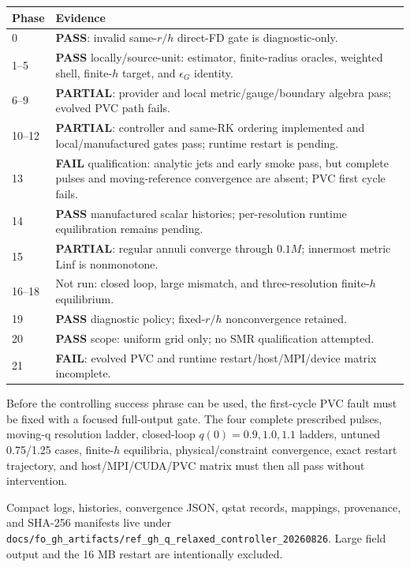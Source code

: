 \documentclass[10pt]{article}
\newcommand{\Pass}{\textcolor{pass}{\textbf{PASS}}}
\newcommand{\Fail}{\textcolor{fail}{\textbf{FAIL}}}
\newcommand{\Partial}{\textcolor{partial}{\textbf{PARTIAL}}}
\newcommand{\code}[1]{\texttt{#1}}
\begin{document}
\small
\begin{longtable}{@{}p{}p{}@{}}
\toprule
Phase & Evidence\\
\midrule
0 & \Pass{}: invalid same-$r/h$ direct-FD gate is diagnostic-only.\\
1--5 & \Pass{} locally/source-unit: estimator, finite-radius oracles, weighted shell, finite-$h$ target, and $\epsilon_G$ identity.\\
6--9 & \Partial{}: provider and local metric/gauge/boundary algebra pass; evolved PVC path fails.\\
10--12 & \Partial{}: controller and same-RK ordering implemented and local/manufactured gates pass; runtime restart is pending.\\
13 & \Fail{} qualification: analytic jets and early smoke pass, but complete pulses and moving-reference convergence are absent; PVC first cycle fails.\\
14 & \Pass{} manufactured scalar histories; per-resolution runtime equilibration remains pending.\\
15 & \Partial{}: regular annuli converge through $0.1M$; innermost metric Linf is nonmonotone.\\
16--18 & Not run: closed loop, large mismatch, and three-resolution finite-$h$ equilibrium.\\
19 & \Pass{} diagnostic policy; fixed-$r/h$ nonconvergence retained.\\
20 & \Pass{} scope: uniform grid only; no SMR qualification attempted.\\
21 & \Fail{}: evolved PVC and runtime restart/host/MPI/device matrix incomplete.\\
\bottomrule
\end{longtable}
\normalsize

Before the controlling success phrase can be used, the first-cycle PVC fault
must be fixed with a focused full-output gate.  The four complete prescribed
pulses, moving-q resolution ladder, closed-loop $q(0)=0.9,1.0,1.1$ ladders,
untuned 0.75/1.25 cases, finite-$h$ equilibria, physical/constraint convergence,
exact restart trajectory, and host/MPI/CUDA/PVC matrix must then all pass
without intervention.

Compact logs, histories, convergence JSON, qstat records, mappings, provenance,
and SHA-256 manifests live under
\code{docs/fo\_gh\_artifacts/ref\_gh\_q\_relaxed\_controller\_20260826}.
Large field output and the 16 MB restart are intentionally excluded.
\end{document}

